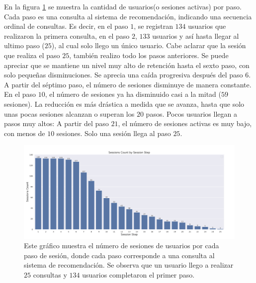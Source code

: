 \documentclass[11pt,a4paper,twoside]{thesis}
\begin{document}
En la figura \ref{fig:llama2-sessions_count_by_session_step} se muestra la cantidad de usuarios(o sesiones activas) por paso. Cada paso es una consulta al sistema de recomendación, indicando una secuencia ordinal de consultas. Es decir, en el paso $1$, se registran $134$ usuarios que realizaron la primera consulta, en el paso $2$, $133$ usuarios y así hasta llegar al ultimo paso ($25$), al cual solo llego un único usuario. Cabe aclarar que la sesión que realiza el paso $25$, también realizo todo los pasos anteriores. Se puede apreciar que se mantiene un nivel muy alto de retención hasta el sexto paso, con solo pequeñas disminuciones.
Se aprecia una caída progresiva después del paso $6$. A partir del séptimo paso, el número de sesiones disminuye de manera constante. En el paso $10$, el número de sesiones ya ha disminuido casi a la mitad ($59$ sesiones). La reducción es más drástica a medida que se avanza, hasta que solo unas pocas sesiones alcanzan o superan los $20$ pasos.
Pocos usuarios llegan a pasos muy altos: A partir del paso $21$, el número de sesiones activas es muy bajo, con menos de $10$ sesiones. Solo una sesión llega al paso $25$.

\begin{figure}[H]
	\centering
	\includegraphics[width=15cm]{./images/llama2/sessions_count_by_session_step.png}
	\caption{Este gráfico muestra el número de sesiones de usuarios por  cada paso de sesión, donde cada paso corresponde a una consulta al sistema de recomendación. Se observa que un usuario llego a realizar $25$ consultas y $134$ usuarios completaron el primer paso.}
	\label{fig:llama2-sessions_count_by_session_step}
\end{figure}
\end{document}

